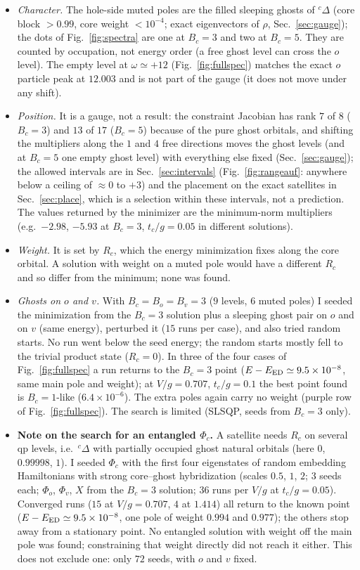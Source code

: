 \documentclass[11pt]{article}
\begin{document}
\begin{itemize}
\item \emph{Character.} The hole-side muted poles are the filled sleeping ghosts of ${}^c\Delta$ (core block $>0.99$, core weight $<10^{-4}$; exact eigenvectors of $\rho$, Sec.~\ref{sec:gauge}); the dots of Fig.~\ref{fig:spectra} are one at $B_c=3$ and two at $B_c=5$. They are counted by occupation, not energy order (a free ghost level can cross the $o$ level).
The empty level at $\omega\simeq+12$ (Fig.~\ref{fig:fullspec}) matches the exact $o$ particle peak at $12.003$ and is not part of the gauge (it does not move under any shift).
\item \emph{Position.} It is a gauge, not a result: the constraint Jacobian has rank $7$ of $8$ ($B_c=3$) and $13$ of $17$ ($B_c=5$) because of the pure ghost orbitals, and shifting the multipliers along the $1$ and $4$ free directions moves the ghost levels (and at $B_c=5$ one empty ghost level) with everything else fixed (Sec.~\ref{sec:gauge}); the allowed intervals are in Sec.~\ref{sec:intervals} (Fig.~\ref{fig:rangeauf}: anywhere below a ceiling of $\approx0$ to $+3$) and the placement on the exact satellites in Sec.~\ref{sec:place}, which is a selection within these intervals, not a prediction.
The values returned by the minimizer are the minimum-norm multipliers (e.g.\ $-2.98$, $-5.93$ at $B_c=3$, $t_c/g=0.05$ in different solutions).
\item \emph{Weight.} It is set by $R_c$, which the energy minimization fixes along the core orbital. A solution with weight on a muted pole would have a different $R_c$ and so differ from the minimum; none was found.
\item \emph{Ghosts on $o$ and $v$.} With $B_c=B_o=B_v=3$ ($9$ levels, $6$ muted poles) I seeded the minimization from the $B_c=3$ solution plus a sleeping ghost pair on $o$ and on $v$ (same energy), perturbed it ($15$ runs per case), and also tried random starts. No run went below the seed energy; the random starts mostly fell to the trivial product state ($R_c=0$).
In three of the four cases of Fig.~\ref{fig:fullspec} a run returns to the $B_c=3$ point ($E-E_{\rm ED}\simeq9.5\times10^{-8}$, same main pole and weight); at $V/g=0.707$, $t_c/g=0.1$ the best point found is $B_c=1$-like ($6.4\times10^{-6}$). The extra poles again carry no weight (purple row of Fig.~\ref{fig:fullspec}). The search is limited (SLSQP, seeds from $B_c=3$ only).
\item \textbf{Note on the search for an entangled $\Phi_c$.} A satellite needs $R_c$ on several qp levels, i.e.\ ${}^c\Delta$ with partially occupied ghost natural orbitals (here $0$, $0.99998$, $1$). I seeded $\Phi_c$ with the first four eigenstates of random embedding Hamiltonians with strong core--ghost hybridization (scales $0.5$, $1$, $2$; $3$ seeds each; $\Phi_o$, $\Phi_v$, $X$ from the $B_c=3$ solution; $36$ runs per $V/g$ at $t_c/g=0.05$). Converged runs ($15$ at $V/g=0.707$, $4$ at $1.414$) all return to the known point ($E-E_{\rm ED}\simeq9.5\times10^{-8}$, one pole of weight $0.994$ and $0.977$); the others stop away from a stationary point. No entangled solution with weight off the main pole was found; constraining that weight directly did not reach it either. This does not exclude one: only $72$ seeds, with $o$ and $v$ fixed.

\end{itemize}
\end{document}
